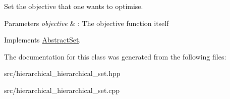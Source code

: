 Set the objective that one wants to optimise. 


\begin{DoxyParams}{Parameters}
{\em objective} & \-: The objective function itself \\
\hline
\end{DoxyParams}


Implements \hyperlink{classAbstractSet_a7aef71679a18ab7965d1098da15b26c2}{Abstract\-Set}.



The documentation for this class was generated from the following files\-:\begin{DoxyCompactItemize}
\item 
src/hierarchical\-\_\-hierarchical\-\_\-set.\-hpp\item 
src/hierarchical\-\_\-hierarchical\-\_\-set.\-cpp\end{DoxyCompactItemize}

